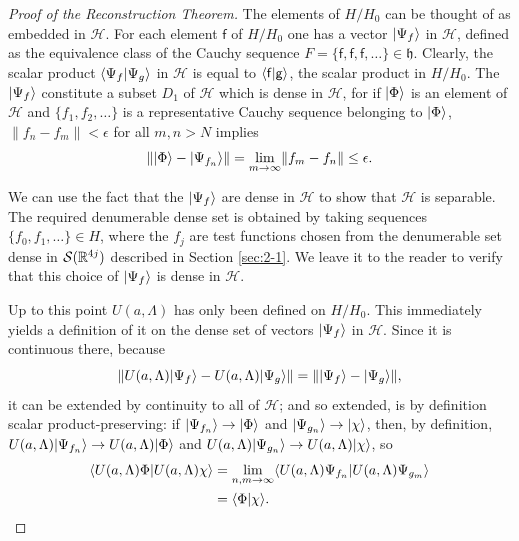 \begin{proof}[Proof of the Reconstruction Theorem]
The elements of \(H/H_0\) can be thought of as embedded in \(\mathcal H\).  For
each element \(\mathsf f\) of \(H/H_0\) one has a vector \(\lvert \Psi_f\rangle\) in
\(\mathcal H\), defined as the equivalence class of the Cauchy sequence
\(F=\{\mathsf f,\mathsf f,\mathsf f,\ldots\}\in\mathfrak h\).  Clearly, the
scalar product \(\langle \Psi_f\vert \Psi_g\rangle\) in \(\mathcal H\) is equal to
\(\langle \mathsf f\vert \mathsf g\rangle\), the scalar product in \(H/H_0\).  The
\(\lvert \Psi_f\rangle\) constitute a subset \(D_1\) of \(\mathcal H\) which is dense
in \(\mathcal H\), for if \(\lvert \Phi\rangle\) is an element of \(\mathcal H\) and
\(\{f_1,f_2,\ldots\}\) is a representative Cauchy sequence belonging to
\(\lvert \Phi\rangle\), \(\lVert f_n-f_m\rVert<\epsilon\) for all \(m,n>N\) implies
\begin{equation*}
\lVert\lvert \Phi\rangle-\lvert \Psi_{f_n}\rangle\rVert
 =\lim_{m\to\infty}\lVert f_m-f_n\rVert\leq\epsilon .
\end{equation*}

We can use the fact that the \(\lvert \Psi_f\rangle\) are dense in \(\mathcal H\) to
show that \(\mathcal H\) is separable.  The required denumerable dense set is
obtained by taking sequences \(\{f_0,f_1,\ldots\}\in H\), where the \(f_j\)
are test functions chosen from the denumerable set dense in
\(\mathcal{S}(\mathbb{R}^{4j})\) described in Section \ref{sec:2-1}.  We leave it to the reader
to verify that this choice of \(\lvert \Psi_f\rangle\) is dense in \(\mathcal H\).

Up to this point \(U(a,\Lambda)\) has only been defined on \(H/H_0\).  This
immediately yields a definition of it on the dense set of vectors
\(\lvert \Psi_f\rangle\) in \(\mathcal H\).  Since it is continuous there, because
\begin{equation*}
\lVert U(a,\Lambda)\lvert \Psi_f\rangle
 -U(a,\Lambda)\lvert \Psi_g\rangle\rVert
 =\lVert\lvert \Psi_f\rangle-\lvert \Psi_g\rangle\rVert ,
\end{equation*}
it can be extended by continuity to all of \(\mathcal H\); and so extended,
is by definition scalar product-preserving: if
\(\lvert \Psi_{f_n}\rangle\to\lvert \Phi\rangle\) and
\(\lvert \Psi_{g_n}\rangle\to\lvert \chi\rangle\), then, by definition,
\(U(a,\Lambda)\lvert \Psi_{f_n}\rangle\to U(a,\Lambda)\lvert \Phi\rangle\) and
\(U(a,\Lambda)\lvert \Psi_{g_n}\rangle\to U(a,\Lambda)\lvert \chi\rangle\), so
\begin{equation*}
\begin{aligned}
\langle U(a,\Lambda)\Phi\vert U(a,\Lambda)\chi\rangle
 &=\lim_{n,m\to\infty}
 \langle U(a,\Lambda)\Psi_{f_n}\vert U(a,\Lambda)\Psi_{g_m}\rangle\\
 &=\langle \Phi\vert \chi\rangle .
\end{aligned}
\end{equation*}


\end{proof}
